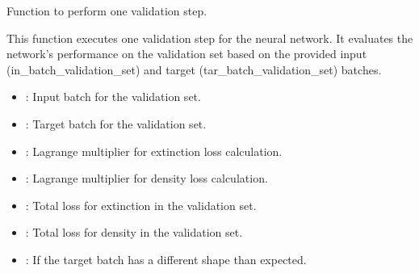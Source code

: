 \documentclass[letterpaper,10pt,english]{sphinxmanual}
\begin{document}
\begin{fulllineitems}
\begin{fulllineitems}
\label{\detokenize{NetworkTrainer:NetworkTrainer.NetworkTrainer.validation}}
\pysigstartsignatures
{}
\pysigstopsignatures
\sphinxAtStartPar
Function to perform one validation step.
\begin{description}
\sphinxAtStartPar
This function executes one validation step for the neural network.
It evaluates the network’s performance on the validation set based on the provided input
(in\_batch\_validation\_set) and target (tar\_batch\_validation\_set) batches.

\begin{itemize}
\item {} 
\sphinxAtStartPar
{}: Input batch for the validation set.

\item {} 
\sphinxAtStartPar
{}: Target batch for the validation set.

\item {} 
\sphinxAtStartPar
{}: Lagrange multiplier for extinction loss calculation.

\item {} 
\sphinxAtStartPar
{}: Lagrange multiplier for density loss calculation.

\item {} 
\sphinxAtStartPar
{}: Total loss for extinction in the validation set.

\item {} 
\sphinxAtStartPar
{}: Total loss for density in the validation set.

\end{itemize}

\begin{itemize}
\item {} 
\sphinxAtStartPar
{}: If the target batch has a different shape than expected.


\end{itemize}
\end{description}
\end{fulllineitems}
\end{fulllineitems}
\end{document}
